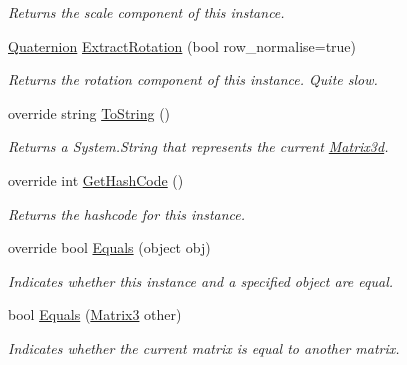 \begin{DoxyCompactItemize}
\begin{DoxyCompactList}\small\item\em Returns the scale component of this instance. \end{DoxyCompactList}\item 
\hyperlink{struct_open_t_k_1_1_quaternion}{Quaternion} \hyperlink{struct_open_t_k_1_1_matrix3_a9cfe37659c37075f95c0520b48a75008}{Extract\-Rotation} (bool row\-\_\-normalise=true)
\begin{DoxyCompactList}\small\item\em Returns the rotation component of this instance. Quite slow. \end{DoxyCompactList}\item 
override string \hyperlink{struct_open_t_k_1_1_matrix3_ae15d7bfeeb90c38b13cc93d140a681f1}{To\-String} ()
\begin{DoxyCompactList}\small\item\em Returns a System.\-String that represents the current \hyperlink{struct_open_t_k_1_1_matrix3d}{Matrix3d}. \end{DoxyCompactList}\item 
override int \hyperlink{struct_open_t_k_1_1_matrix3_a12ef09bb782042c4fa16030f99d7c27f}{Get\-Hash\-Code} ()
\begin{DoxyCompactList}\small\item\em Returns the hashcode for this instance. \end{DoxyCompactList}\item 
override bool \hyperlink{struct_open_t_k_1_1_matrix3_a1e605a515bd7316b41953c31ddb7f512}{Equals} (object obj)
\begin{DoxyCompactList}\small\item\em Indicates whether this instance and a specified object are equal. \end{DoxyCompactList}\item 
bool \hyperlink{struct_open_t_k_1_1_matrix3_a65c43df004ef3111edab49b8e6d7d01a}{Equals} (\hyperlink{struct_open_t_k_1_1_matrix3}{Matrix3} other)
\begin{DoxyCompactList}\small\item\em Indicates whether the current matrix is equal to another matrix.\end{DoxyCompactList}\end{DoxyCompactItemize}
